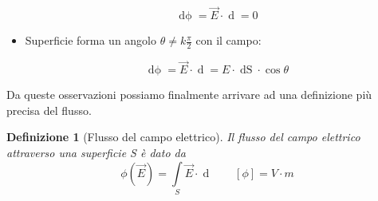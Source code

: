 \documentclass[a4paper,12pt,titlepage,openany]{book}
\theoremstyle{mydef}
\newtheorem{definizione}{Definizione}[chapter]
\begin{document}
\begin{itemize}
{\begin{center}
                    \end{center}
                    \begin{equation*}
                    \mathop{d\phi} = \vec{E}\cdot\mathop{d\vec{S}} = 0
                    \end{equation*}
                }
                \item{
                    Superficie forma un angolo $\theta\neq k\frac{\pi}{2}$ con il campo:\\
                    \begin{center}
                    \end{center}
                    \begin{equation*}
                    \mathop{d\phi} = \vec{E}\cdot\mathop{d\vec{S}} = E\cdot\mathop{dS}\cdot\cos\theta
                    \end{equation*}
                }
            \end{itemize}
        
            Da queste osservazioni possiamo finalmente arrivare ad una definizione più precisa del flusso.
            \begin{definizione}[Flusso del campo elettrico]
                Il flusso del campo elettrico attraverso una superficie S è dato da
                \begin{equation}
                    \phi(\vec{E}) = \int\limits_{S} \vec{E}\cdot\mathop{d\vec{S}} \qquad [\phi] = V\cdot m
                \end{equation}
            \end{definizione}
            
\end{document}
